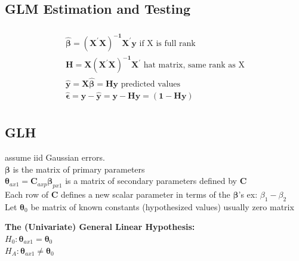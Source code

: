 \documentclass[openany]{book}
\newcommand{\B}{\beta}
\newcommand{\hb}{\hat{\beta}}
\numberwithin{equation}{section}
\begin{document}
\begin{flushleft}
\chapter{GLM Estimation and Testing}
\begin{multline*}\\
\bm{\hb}=\bm{(X^{'}X)^{-1}X^{'}y}\text{ if X is full rank}\\
\bm{H}=\bm{X(X^{'}X)^{-1}X^{'}} \text{ hat matrix, same rank as X}\\
\hat{\bm{y}}=\bm{X\hb}=\bm{Hy} \text{ predicted values}\\
\bm{\hat{\epsilon}}=\bm{y-\hat{y}}=\bm{y-Hy}=\bm{(1-Hy)}\\
\end{multline*}
\section{GLH}
assume iid Gaussian errors.\\
$\bm{\B}$ is the matrix of primary parameters\\
$\bm{\theta}_{ax1}=\bm{C}_{axp}\bm{\B}_{px1}$ is a matrix of secondary parameters defined by $\bm{C}$\\
Each row of $\bm{C}$ defines a new scalar parameter in terms of the $\bm{\B}$'s ex: $\B_1-\B_2$\\
Let $\bm{\theta}_0$ be matrix of known constants (hypothesized values) usually zero matrix\\
\begin{center}
\textbf{The (Univariate) General Linear Hypothesis:}\\
$H_0:\bm{\theta}_{ax1}=\bm{\theta}_0$\\
$H_A:\bm{\theta}_{ax1}\neq\bm{\theta}_0$
\end{center}
\pagebreak

\end{flushleft}
\end{document}
